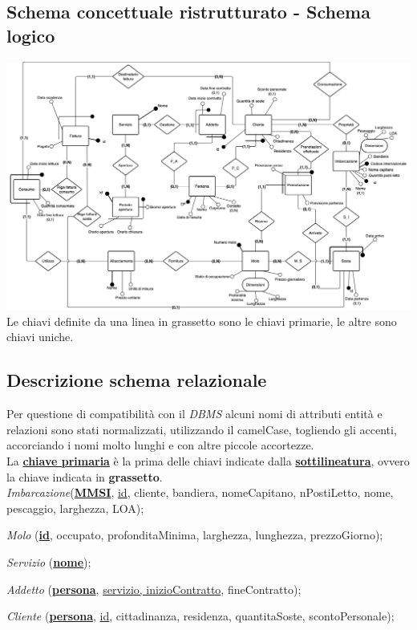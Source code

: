 \subsection{Schema concettuale ristrutturato - Schema logico}
\includegraphics[width=\textwidth]{img/erlogico.png}
Le chiavi definite da una linea in grassetto sono le chiavi primarie, le altre sono chiavi uniche.

\subsection{Descrizione schema relazionale}

Per questione di compatibilità con il \textit{DBMS} alcuni nomi di attributi entità e relazioni sono stati normalizzati, utilizzando il camelCase, togliendo gli accenti, accorciando i nomi molto lunghi e con altre piccole accortezze.\\

La \underline{\textbf{chiave primaria}} è la prima delle chiavi indicate dalla \underline{\textbf{sottilineatura}}, ovvero la chiave indicata in \textbf{grassetto}.\\

\textit{Imbarcazione}(\underline{\textbf{MMSI}}, \underline{id}, cliente, bandiera, nomeCapitano, nPostiLetto, nome, pescaggio, larghezza, LOA);

\textit{Molo} (\underline{\textbf{id}}, occupato, profonditaMinima, larghezza, lunghezza, prezzoGiorno);

\textit{Servizio} (\underline{\textbf{nome}});

\textit{Addetto} (\underline{\textbf{persona}}, \underline{servizio, inizioContratto}, fineContratto);

\textit{Cliente} (\underline{\textbf{persona}}, \underline{id}, cittadinanza, residenza, quantitaSoste, scontoPersonale);

